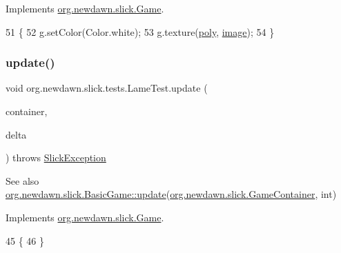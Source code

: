 Implements \mbox{\hyperlink{interfaceorg_1_1newdawn_1_1slick_1_1_game_af1a4670d43eb3ba04dfcf55ab1975b64}{org.\+newdawn.\+slick.\+Game}}.


\begin{DoxyCode}
51                                                                                   \{
52         g.setColor(Color.white);
53         g.texture(\mbox{\hyperlink{classorg_1_1newdawn_1_1slick_1_1tests_1_1_lame_test_a5d3e81e1db5ba7234621635d3665753d}{poly}}, \mbox{\hyperlink{classorg_1_1newdawn_1_1slick_1_1tests_1_1_lame_test_a00beddefcc3b233938def19fc8d969fb}{image}});
54     \}
\end{DoxyCode}
\mbox{\label{classorg_1_1newdawn_1_1slick_1_1tests_1_1_lame_test_a05a4fafc189bb19b18d3238b308ca933}} 
\subsubsection{\texorpdfstring{update()}{update()}}
{\footnotesize\ttfamily void org.\+newdawn.\+slick.\+tests.\+Lame\+Test.\+update (\begin{DoxyParamCaption}\item[{\mbox{\hyperlink{classorg_1_1newdawn_1_1slick_1_1_game_container}{Game\+Container}}}]{container,  }\item[{int}]{delta }\end{DoxyParamCaption}) throws \mbox{\hyperlink{classorg_1_1newdawn_1_1slick_1_1_slick_exception}{Slick\+Exception}}\hspace{0.3cm}{\ttfamily [inline]}}

\begin{DoxySeeAlso}{See also}
\mbox{\hyperlink{classorg_1_1newdawn_1_1slick_1_1_basic_game_acfe6fa05aef83bff1631af91a3e4bd20}{org.\+newdawn.\+slick.\+Basic\+Game\+::update}}(\mbox{\hyperlink{classorg_1_1newdawn_1_1slick_1_1_game_container}{org.\+newdawn.\+slick.\+Game\+Container}}, int) 
\end{DoxySeeAlso}


Implements \mbox{\hyperlink{interfaceorg_1_1newdawn_1_1slick_1_1_game_ab07b2e9463ee4631620dde0de25bdee8}{org.\+newdawn.\+slick.\+Game}}.


\begin{DoxyCode}
45                                                                                  \{
46     \}
\end{DoxyCode}


